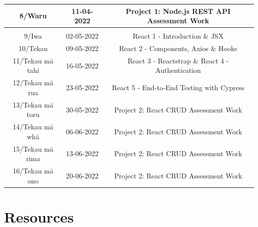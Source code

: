 \documentclass{article}
\begin{document}
\begin{tabular}{|c|c|c|c|}
	\footnotesize 8/Waru           & \footnotesize 11-04-2022 & \multicolumn{2}{c|}{\footnotesize Project 1: Node.js REST API Assessment Work}                                                   \\ \hline
	\rowcolor{yellow} \multicolumn{4}{|c|}{\footnotesize Mid Term Break}                                                                                                                         \\ \hline
	\footnotesize 9/Iwa            & \footnotesize 02-05-2022 & \multicolumn{2}{c|}{\footnotesize React 1 - Introduction \& JSX}                                                                 \\ \hline
	\footnotesize 10/Tekau         & \footnotesize 09-05-2022 & \multicolumn{2}{c|}{\footnotesize React 2 - Components, Axios \& Hooks}                                                          \\ \hline
	\footnotesize 11/Tekau mā tahi & \footnotesize 16-05-2022 & \multicolumn{2}{c|}{\footnotesize React 3 - Reactstrap \& React 4 - Authentication}                                                                           \\ \hline
	\footnotesize 12/Tekau mā rua  & \footnotesize 23-05-2022 & \multicolumn{2}{c|}{\footnotesize React 5 - End-to-End Testing with Cypress}                                           \\ \hline
	\footnotesize 13/Tekau mā toru & \footnotesize 30-05-2022 & \multicolumn{2}{c|}{\footnotesize Project 2: React CRUD Assessment Work}                                                     \\ \hline
	\footnotesize 14/Tekau mā whā  & \footnotesize 06-06-2022 & \multicolumn{2}{c|}{\footnotesize Project 2: React CRUD Assessment Work}                                                         \\ \hline
	\footnotesize 15/Tekau mā rima & \footnotesize 13-06-2022 & \multicolumn{2}{c|}{\footnotesize Project 2: React CRUD Assessment Work}                                                         \\ \hline
	\footnotesize 16/Tekau mā ono  & \footnotesize 20-06-2022 & \multicolumn{2}{c|}{\footnotesize Project 2: React CRUD Assessment  Work}                                                        \\ \hline
\end{tabular}

\section*{Resources}
\end{document}
